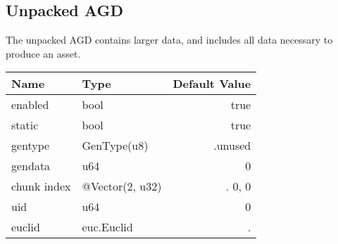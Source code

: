 \subsection{Unpacked AGD}

The unpacked AGD contains larger data, and includes all data necessary to produce an asset.

\begin{tabular}{|l|l|r|}
    \hline
    \textbf{Name} & \textbf{Type} & \textbf{Default Value}\\
    \hline
    enabled & bool & true\\
    static & bool & true\\
    gentype & GenType(u8) & .unused\\
    gendata & u64 & 0 \\
    chunk index & @Vector(2, u32) & .{ 0, 0 }\\
    uid & u64 & 0\\

    euclid & euc.Euclid & .{}\\
    \hline
\end{tabular}
